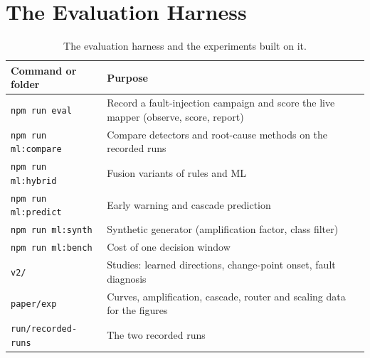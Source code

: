 \section{The Evaluation Harness}
\begin{table}[!htbp]
\centering
\caption{The evaluation harness and the experiments built on it.}
\label{tab:harness}
\small
\renewcommand{\arraystretch}{1.2}
\begin{tabularx}{\textwidth}{>{\raggedright\arraybackslash}p{4.4cm}>{\raggedright\arraybackslash}X}
\toprule
\textbf{Command or folder} & \textbf{Purpose}\\
\midrule
\texttt{npm run eval} & Record a fault-injection campaign and score the live mapper (observe, score, report)\\
\texttt{npm run ml:compare} & Compare detectors and root-cause methods on the recorded runs\\
\texttt{npm run ml:hybrid} & Fusion variants of rules and ML\\
\texttt{npm run ml:predict} & Early warning and cascade prediction\\
\texttt{npm run ml:synth} & Synthetic generator (amplification factor, class filter)\\
\texttt{npm run ml:bench} & Cost of one decision window\\
\texttt{v2/} & Studies: learned directions, change-point onset, fault diagnosis\\
\texttt{paper/exp} & Curves, amplification, cascade, router and scaling data for the figures\\
\texttt{run/recorded-runs} & The two recorded runs\\
\bottomrule
\end{tabularx}
\end{table}
